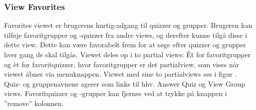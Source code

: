 \subsubsection{View Favorites}
Favorites viewet er brugerens hurtig-adgang til quizzer og grupper. Brugeren kan tilføje favoritgrupper og -quizzer fra andre views, og derefter kunne tilgå disse i dette view. Dette kan være favorabelt frem for at søge efter quizzer og grupper hver gang de skal tilgås. \newline
Viewet deles op i to partial views: Èt for favoritgrupper og èt for favoritquizzer, hvor favoritgrupper er det partialview, som vises når viewet åbnes via menuknappen. Viewet med sine to partialviews ses i figur .
Quiz- og gruppenavnene agerer som links til hhv. Answer Quiz og View Group views. Favoritquizzer og -grupper kan fjernes ved at trykke på knappen i ''remove'' kolonnen.
